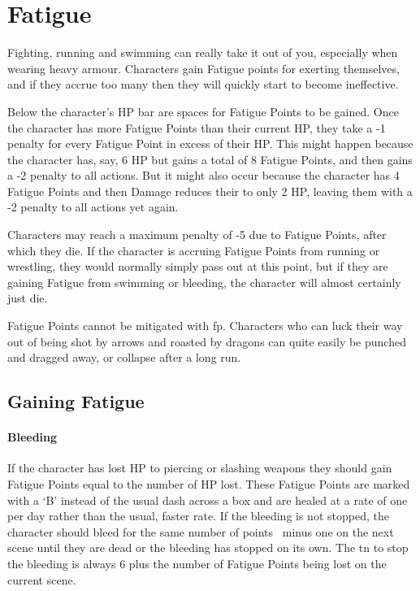 \documentclass[titlepage,a4paper,openany]{book}
\begin{document}
\section{Fatigue}

\begin{multicols}{2}

\label{fatigue}Fighting, running and swimming can really take it out of you, especially when wearing heavy armour. Characters gain Fatigue points for exerting themselves, and if they accrue too many then they will quickly start to become ineffective.

Below the character's HP bar are spaces for Fatigue Points to be gained. Once the character has more Fatigue Points than their current HP, they take a -1 penalty for every Fatigue Point in excess of their HP.  This might happen because the character has, say, 6 HP but gains a total of 8 Fatigue Points, and then gains a -2 penalty to all actions. But it might also occur because the character has 4 Fatigue Points and then Damage reduces their to only 2 HP, leaving them with a -2 penalty to all actions yet again.

Characters may reach a maximum penalty of -5 due to Fatigue Points, after which they die. If the character is accruing Fatigue Points from running or wrestling, they would normally simply pass out at this point, but if they are gaining Fatigue from swimming or bleeding, the character will almost certainly just die.

Fatigue Points cannot be mitigated with \gls{fp}. Characters who can luck their way out of being shot by arrows and roasted by dragons can quite easily be punched and dragged away, or collapse after a long run.

\subsection{Gaining Fatigue}

\paragraph{Bleeding} If the character has lost HP to piercing or slashing weapons they should gain Fatigue Points equal to the number of HP lost. These Fatigue Points are marked with a `B' instead of the usual dash across a box and are healed at a rate of one per day rather than the usual, faster rate. If the bleeding is not stopped, the character should bleed for the same number of points \ minus one on the next scene until they are dead or the bleeding has stopped on its own. The \gls{tn} to stop the bleeding is always 6 plus the number of Fatigue Points being lost on the current scene.


\end{multicols}
\end{document}
